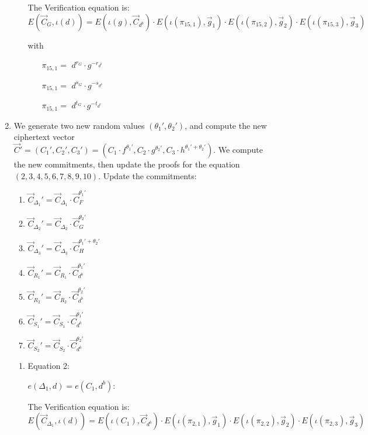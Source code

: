 \begin{description}
\begin{enumerate}
\begin{enumerate}
      The Verification equation is: $E(\vec{C}_G, \iota(d)) = E(\iota(g), \vec{C}_{d^b}) \cdot E(\iota(\pi_{15,1}), \vec{g}_1)\cdot E(\iota(\pi_{15,2}), \vec{g}_2)\cdot E(\iota(\pi_{15,3}), \vec{g}_3)$

      with

      \begin{itemize}
      \item[$\pi_{15,1} = $] $d^{r_G} \cdot g^{-r_{d^b}}$    
      \item[$\pi_{15,1} = $] $d^{s_G} \cdot g^{-s_{d^b}}$    
      \item[$\pi_{15,1} = $] $d^{t_G} \cdot g^{-t_{d^b}}$
      \end{itemize}

    \end{enumerate}

  \item We generate two new random values $(\theta_1', \theta_2')$, and compute the new ciphertext vector $\vec{C}' = (C_1', C_2', C_3') = (C_1 \cdot f^{\theta_1'}, C_2 \cdot g^{\theta_2'}, C_3 \cdot h^{\theta_1'+\theta_2'})$. We compute the new commitments, then update the proofs for the equation $(2, 3, 4, 5, 6, 7, 8, 9, 10)$. Update the commitments:
    \begin{enumerate}
    \item $\vec{C}_{\Delta_1}' = \vec{C}_{\Delta_1} \cdot \vec{C}_{F}^{\theta_1'}$
    \item $\vec{C}_{\Delta_2}' = \vec{C}_{\Delta_2} \cdot \vec{C}_{G}^{\theta_2'}$
    \item $\vec{C}_{\Delta_3}' = \vec{C}_{\Delta_3} \cdot \vec{C}_{H}^{\theta_1' + \theta_2'}$
    \item $\vec{C}_{R_1}' = \vec{C}_{R_1} \cdot \vec{C}_{d^b}^{\theta_1'}$
    \item $\vec{C}_{R_2}' = \vec{C}_{R_2} \cdot \vec{C}_{d^b}^{\theta_2'}$
    \item $\vec{C}_{S_1}' = \vec{C}_{S_1} \cdot \vec{C}_{d^b}^{\theta_1'}$
    \item $\vec{C}_{S_2}' = \vec{C}_{S_2} \cdot \vec{C}_{d^b}^{\theta_2'}$
    \end{enumerate}
    \begin{enumerate}
    \item Equation 2:

      $e(\boxed{\Delta_1},d) = e(C_1, \boxed{d^b})$:
      
      The Verification equation is:  $E(\vec{C}_{\Delta_1}, \iota(d)) = E(\iota(C_1), \vec{C}_{d^b}) \cdot E(\iota(\pi_{2,1}), \vec{g}_1)\cdot E(\iota(\pi_{2,2}), \vec{g}_2)\cdot E(\iota(\pi_{2,3}), \vec{g}_3)$
      

\end{enumerate}
\end{enumerate}
\end{description}
